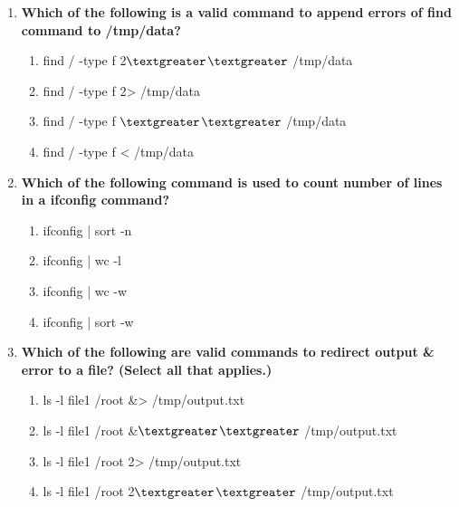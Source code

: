 \begin{flushleft}
\begin{enumerate}
		
		\item \textbf{Which of the following is a valid command to append errors of find command to \textbf{/tmp/data}?}
		\begin{enumerate}[label=(\alph*)]
			\item find / -type f 2{$\textgreater$}{$\textgreater$} /tmp/data   %
			\item find / -type f 2> /tmp/data   
			\item find / -type f {$\textgreater$}{$\textgreater$} /tmp/data   
			\item find / -type f < /tmp/data
		\end{enumerate}
		\bigskip
		\bigskip
		
	
		\bigskip
		\bigskip
		\item \textbf{Which of the following command is used to count number of lines in a \textbf{ifconfig} command?}
		\begin{enumerate}[label=(\alph*)]
			\item ifconfig | sort -n
			\item ifconfig | wc -l         %
			\item ifconfig | wc -w 
			\item ifconfig | sort -w
		\end{enumerate}

		\bigskip
		\bigskip
		\item \textbf{Which of the following are valid commands to redirect output \& error to a file? (Select all that applies.)}
		\begin{enumerate}[label=(\alph*)]
			\item ls -l file1 /root  \&> /tmp/output.txt   %
			\item ls -l file1 /root  \&{$\textgreater$}{$\textgreater$} /tmp/output.txt %
			\item ls -l file1 /root  2> /tmp/output.txt
			\item ls -l file1 /root  2{$\textgreater$}{$\textgreater$} /tmp/output.txt
		\end{enumerate}
		
	\end{enumerate}
	
	
\end{flushleft}

\newpage


